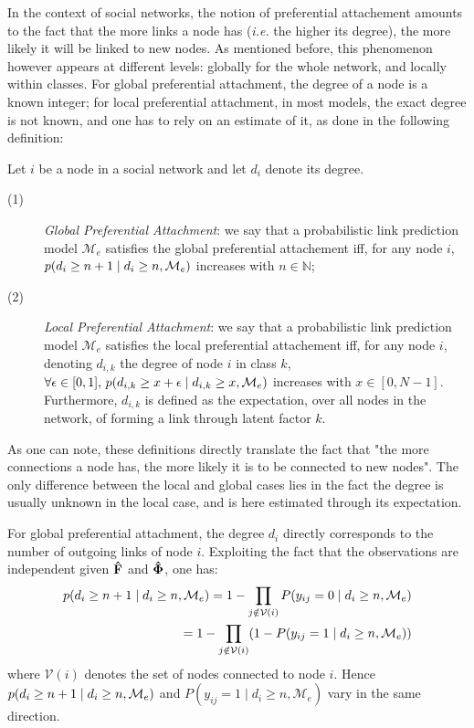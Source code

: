 In the context of social networks, the notion of preferential attachement amounts to the fact that the more links a node has (\textit{i.e.} the higher its degree), the more likely it will be linked to new nodes. As mentioned before, this phenomenon however appears at different levels: globally for the whole network, and locally within classes. For global preferential attachment, the degree of a node is a known integer; for local preferential attachment, in most models, the exact degree is not known, and one has to rely on an estimate of it, as done in the following definition:
%
\begin{definition}
Let $i$ be a node in a social network and let $d_i$ denote its degree. 
\begin{description}
 \item[(1)] \emph{Global Preferential Attachment}: we say that a probabilistic link prediction model $\mathcal{M}_e$ satisfies the global preferential attachement iff, for any node $i$, $p(d_i \ge n+1 \mid d_i \ge n, \mathcal{M}_e)$ increases with $n \in \mathbb{N}$;
 \item[(2)] \emph{Local Preferential Attachment}: we say that a probabilistic link prediction model $\mathcal{M}_e$ satisfies the local preferential attachement iff, for any node $i$, denoting $d_{i,k}$ the degree of node $i$ in class $k$, $\forall \epsilon \in [0,1], \, p(d_{i,k} \ge x+\epsilon \mid d_{i,k} \ge x, \mathcal{M}_e)$ increases with $x \in [0,N-1]$. Furthermore, $d_{i,k}$ is defined as the expectation, over all nodes in the network, of forming a link through latent factor $k$.
\end{description}
\label{def:burst-soc-net}
\end{definition}
%
As one can note, these definitions directly translate the fact that "the more connections a node has, the more likely it is to be connected to new nodes". The only difference between the local and global cases lies in the fact the degree is usually unknown in the local case, and is here estimated through its expectation.

For global preferential attachment, the degree $d_i$ directly corresponds to the number of outgoing links of node $i$. Exploiting the fact that the observations are independent given $\mathbf{\hat{F}}$ and $\mathbf{\hat{\Phi}}$, one has:
%
\begin{align}
p(d_{i} \ge n+1 \mid d_{i} \ge n, \mathcal{M}_e) = 1 - \prod_{j \notin \mathcal{V}(i)} P(y_{ij} = 0 \mid d_{i} \ge n, \mathcal{M}_e) \nonumber \\
= 1 - \prod_{j \notin \mathcal{V}(i)} (1 - P(y_{ij} = 1 \mid d_{i} \ge n, \mathcal{M}_e)) \nonumber
\end{align}
%
where $\mathcal{V}(i)$ denotes the set of nodes connected to node $i$. Hence $p(d_{i} \ge n+1 \mid d_{i} \ge n, \mathcal{M}_e)$ and $P(y_{ij} = 1 \mid d_{i} \ge n, \mathcal{M}_e)$ vary in the same direction. 

